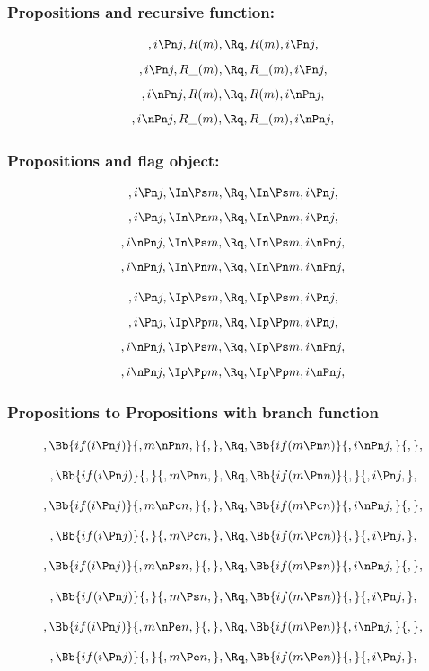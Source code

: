 \bigskip
\bigskip
\bigskip
\bigskip
\subsubsection{ Propositions and recursive function:}
\[,i \Pn j, R(m), \Rq , R(m), i \Pn j,\]
\[,i \Pn j, R\_(m), \Rq , R\_(m), i \Pn j,\]
\[,i \nPn j,R(m), \Rq , R(m), i \nPn j,\]
\[,i \nPn j, R\_(m), \Rq , R\_(m), i \nPn j,\]



\bigskip
\bigskip
\bigskip
\bigskip
\subsubsection{ Propositions and flag object:}
\[,i \Pn j, \In \Ps m, \Rq , \In \Ps m, i \Pn j,\]
\[,i \Pn j, \In \Pn m, \Rq , \In \Pn m, i \Pn j,\]
\[,i \nPn j,\In \Ps m, \Rq , \In \Ps m, i \nPn j,\]
\[,i \nPn j, \In \Pn m, \Rq , \In \Pn m, i \nPn j,\]

\[,i \Pn j, \Ip \Ps m, \Rq , \Ip \Ps m, i \Pn j,\]
\[,i \Pn j, \Ip \Pp m, \Rq , \Ip \Pp m, i \Pn j,\]
\[,i \nPn j,\Ip \Ps m, \Rq , \Ip \Ps m, i \nPn j,\]
\[,i \nPn j, \Ip \Pp m, \Rq , \Ip \Pp m, i \nPn j,\]





\bigskip
\bigskip
\bigskip
\bigskip
\subsubsection{ Propositions to Propositions with branch function}
\[, \Bb{if(i \Pn j)}{,m \nPn n,}{,}, \Rq , \Bb{if(m \Pn n)}{,i \nPn j,}{,},\]

\bigskip
\bigskip
\[, \Bb{if(i \Pn j)}{,}{,m \Pn n,}, \Rq , \Bb{if(m \Pn n)}{,}{,i \Pn j,},\]


\bigskip
\bigskip
\[, \Bb{if(i \Pn j)}{,m \nPc n,}{,}, \Rq , \Bb{if(m \Pc n)}{,i \nPn j,}{,},\]

\bigskip
\bigskip
\[, \Bb{if(i \Pn j)}{,}{,m \Pc n,}, \Rq , \Bb{if(m \Pc n)}{,}{,i \Pn j,},\]


\bigskip
\bigskip
\[, \Bb{if(i \Pn j)}{,m \nPs n,}{,}, \Rq , \Bb{if(m \Ps n)}{,i \nPn j,}{,},\]

\bigskip
\bigskip
\[, \Bb{if(i \Pn j)}{,}{,m \Ps n,}, \Rq , \Bb{if(m \Ps n)}{,}{,i \Pn j,},\]

\bigskip
\bigskip
\[, \Bb{if(i \Pn j)}{,m \nPe n,}{,}, \Rq , \Bb{if(m \Pe n)}{,i \nPn j,}{,},\]

\bigskip
\bigskip
\[, \Bb{if(i \Pn j)}{,}{,m \Pe n,}, \Rq , \Bb{if(m \Pe n)}{,}{,i \Pn j,},\]

